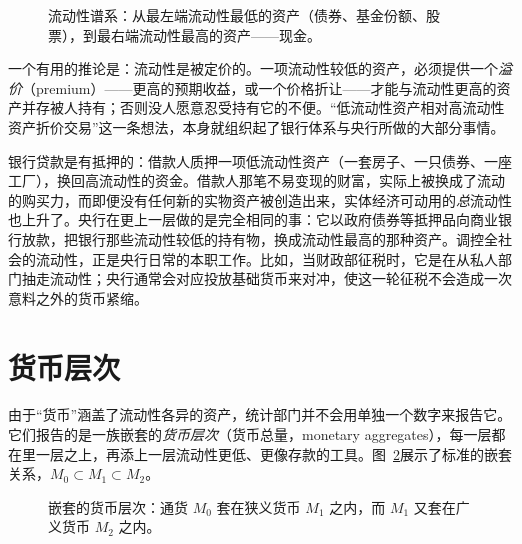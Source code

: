 \begin{figure}[h]
\centering

\caption{流动性谱系：从最左端流动性最低的资产（债券、基金份额、股票），到最右端流动性最高的资产——现金。}
\label{fig:macro-10}
\end{figure}


一个有用的推论是：流动性是被定价的。一项流动性较低的资产，必须提供一个\emph{溢价}（premium）——更高的预期收益，或一个价格折让——才能与流动性更高的资产并存被人持有；否则没人愿意忍受持有它的不便。“低流动性资产相对高流动性资产折价交易”这一条想法，本身就组织起了银行体系与央行所做的大部分事情。

\begin{remark}[银行业即一场流动性转换]
银行贷款是有抵押的：借款人质押一项低流动性资产（一套房子、一只债券、一座工厂），换回高流动性的资金。借款人那笔不易变现的财富，实际上被换成了流动的购买力，而即便没有任何新的实物资产被创造出来，实体经济可动用的\emph{总}流动性也上升了。央行在更上一层做的是完全相同的事：它以政府债券等抵押品向商业银行放款，把银行那些流动性较低的持有物，换成流动性最高的那种资产。调控全社会的流动性，正是央行日常的本职工作。比如，当财政部征税时，它是在从私人部门抽走流动性；央行通常会对应投放基础货币来对冲，使这一轮征税不会造成一次意料之外的货币紧缩。
\end{remark}

\section{货币层次}

由于“货币”涵盖了流动性各异的资产，统计部门并不会用单独一个数字来报告它。它们报告的是一族嵌套的\emph{货币层次}（货币总量，monetary aggregates），每一层都在里一层之上，再添上一层流动性更低、更像存款的工具。图~\ref{fig:macro-11}展示了标准的嵌套关系，$M_0 \subset M_1 \subset M_2$。

\begin{figure}[h]
\centering

\caption{嵌套的货币层次：通货 $M_0$ 套在狭义货币 $M_1$ 之内，而 $M_1$ 又套在广义货币 $M_2$ 之内。}
\label{fig:macro-11}
\end{figure}


